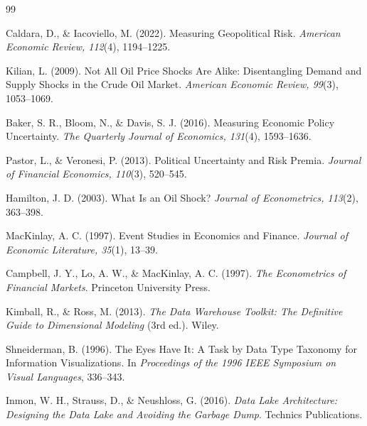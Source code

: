 \documentclass[11pt,a4paper]{article}
\begin{document}
\begin{thebibliography}{99}

Caldara, D., \& Iacoviello, M. (2022).
Measuring Geopolitical Risk.
\emph{American Economic Review, 112}(4), 1194--1225.

Kilian, L. (2009).
Not All Oil Price Shocks Are Alike: Disentangling Demand and Supply Shocks in the Crude Oil Market.
\emph{American Economic Review, 99}(3), 1053--1069.

Baker, S. R., Bloom, N., \& Davis, S. J. (2016).
Measuring Economic Policy Uncertainty.
\emph{The Quarterly Journal of Economics, 131}(4), 1593--1636.

Pastor, L., \& Veronesi, P. (2013).
Political Uncertainty and Risk Premia.
\emph{Journal of Financial Economics, 110}(3), 520--545.

Hamilton, J. D. (2003).
What Is an Oil Shock?
\emph{Journal of Econometrics, 113}(2), 363--398.

MacKinlay, A. C. (1997).
Event Studies in Economics and Finance.
\emph{Journal of Economic Literature, 35}(1), 13--39.

Campbell, J. Y., Lo, A. W., \& MacKinlay, A. C. (1997).
\emph{The Econometrics of Financial Markets}.
Princeton University Press.

Kimball, R., \& Ross, M. (2013).
\emph{The Data Warehouse Toolkit: The Definitive Guide to Dimensional Modeling}
(3rd ed.). Wiley.

Shneiderman, B. (1996).
The Eyes Have It: A Task by Data Type Taxonomy for Information Visualizations.
In \emph{Proceedings of the 1996 IEEE Symposium on Visual Languages}, 336--343.

Inmon, W. H., Strauss, D., \& Neushloss, G. (2016).
\emph{Data Lake Architecture: Designing the Data Lake and Avoiding the Garbage Dump}.
Technics Publications.

\end{thebibliography}


\newpage

\appendix
\end{document}
